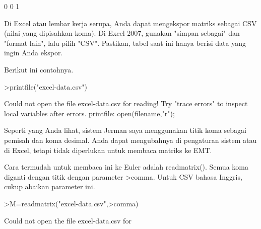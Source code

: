 \documentclass[a4paper,10pt]{article}
\begin{document}
\begin{eulernotebook}
\begin{eulercomment}
\begin{eulercomment}
\begin{eulercomment}
\begin{eulercomment}
\begin{eulercomment}
\begin{eulercomment}
\begin{eulercomment}
\begin{eulercomment}
\begin{eulercomment}
\begin{eulercomment}
\begin{eulercomment}
\begin{eulercomment}
\begin{eulercomment}
\begin{eulercomment}
\begin{eulercomment}
\begin{eulercomment}
\begin{eulercomment}
\begin{eulercomment}
\begin{eulercomment}
\begin{eulercomment}
\begin{eulercomment}
\begin{eulercomment}
\begin{eulercomment}
\begin{eulercomment}
\begin{eulercomment}
\begin{eulercomment}
\begin{eulercomment}
\begin{eulercomment}
\begin{eulercomment}
\begin{eulercomment}
\begin{eulercomment}
\begin{eulercomment}
\begin{eulercomment}
\begin{eulercomment}
\begin{eulercomment}
\begin{eulercomment}
\begin{eulercomment}
\begin{eulercomment}
\begin{eulercomment}
\begin{eulercomment}
\begin{eulercomment}
\begin{eulercomment}
\begin{eulercomment}
\begin{eulercomment}
\begin{eulercomment}
\begin{eulercomment}
\begin{eulercomment}
\begin{eulercomment}
\begin{eulercomment}
\begin{eulercomment}
\begin{eulercomment}
\begin{eulercomment}
\begin{eulercomment}
\begin{eulercomment}
\begin{eulercomment}
\begin{eulercomment}
\begin{eulercomment}
\begin{eulercomment}
\begin{eulercomment}
\begin{eulercomment}
\begin{eulercomment}
\begin{eulercomment}
\begin{eulercomment}
\begin{eulercomment}
\begin{eulercomment}
\begin{eulercomment}
\begin{eulercomment}
\begin{eulercomment}
\begin{eulercomment}
\begin{eulercomment}
\begin{euleroutput}
     0         0         1 
\end{euleroutput}
\begin{eulercomment}
Di Excel atau lembar kerja serupa, Anda dapat mengekspor matriks
sebagai CSV (nilai yang dipisahkan koma). Di Excel 2007, gunakan
"simpan sebagai" dan "format lain", lalu pilih "CSV". Pastikan, tabel
saat ini hanya berisi data yang ingin Anda ekspor.

Berikut ini contohnya.
\end{eulercomment}
\begin{eulerprompt}
>printfile("excel-data.csv")
\end{eulerprompt}
\begin{euleroutput}
  Could not open the file
  excel-data.csv
  for reading!
  Try "trace errors" to inspect local variables after errors.
  printfile:
      open(filename,"r");
\end{euleroutput}
\begin{eulercomment}
Seperti yang Anda lihat, sistem Jerman saya menggunakan titik koma
sebagai pemisah dan koma desimal. Anda dapat mengubahnya di pengaturan
sistem atau di Excel, tetapi tidak diperlukan untuk membaca matriks ke
EMT.

Cara termudah untuk membaca ini ke Euler adalah readmatrix(). Semua
koma diganti dengan titik dengan parameter \textgreater{}comma. Untuk CSV bahasa
Inggris, cukup abaikan parameter ini.
\end{eulercomment}
\begin{eulerprompt}
>M=readmatrix("excel-data.csv",>comma)
\end{eulerprompt}
\begin{euleroutput}
  Could not open the file
  excel-data.csv
  for 
\end{euleroutput}
\end{eulercomment}
\end{eulercomment}
\end{eulercomment}
\end{eulercomment}
\end{eulercomment}
\end{eulercomment}
\end{eulercomment}
\end{eulercomment}
\end{eulercomment}
\end{eulercomment}
\end{eulercomment}
\end{eulercomment}
\end{eulercomment}
\end{eulercomment}
\end{eulercomment}
\end{eulercomment}
\end{eulercomment}
\end{eulercomment}
\end{eulercomment}
\end{eulercomment}
\end{eulercomment}
\end{eulercomment}
\end{eulercomment}
\end{eulercomment}
\end{eulercomment}
\end{eulercomment}
\end{eulercomment}
\end{eulercomment}
\end{eulercomment}
\end{eulercomment}
\end{eulercomment}
\end{eulercomment}
\end{eulercomment}
\end{eulercomment}
\end{eulercomment}
\end{eulercomment}
\end{eulercomment}
\end{eulercomment}
\end{eulercomment}
\end{eulercomment}
\end{eulercomment}
\end{eulercomment}
\end{eulercomment}
\end{eulercomment}
\end{eulercomment}
\end{eulercomment}
\end{eulercomment}
\end{eulercomment}
\end{eulercomment}
\end{eulercomment}
\end{eulercomment}
\end{eulercomment}
\end{eulercomment}
\end{eulercomment}
\end{eulercomment}
\end{eulercomment}
\end{eulercomment}
\end{eulercomment}
\end{eulercomment}
\end{eulercomment}
\end{eulercomment}
\end{eulercomment}
\end{eulercomment}
\end{eulercomment}
\end{eulercomment}
\end{eulercomment}
\end{eulercomment}
\end{eulercomment}
\end{eulercomment}
\end{eulercomment}
\end{eulernotebook}
\end{document}
